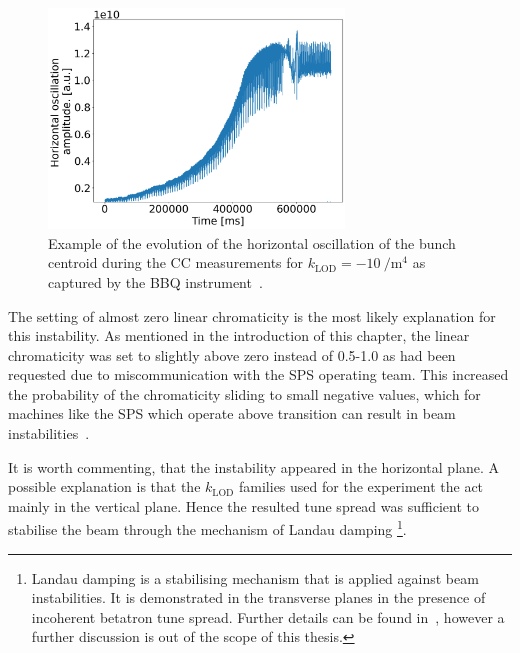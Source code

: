 \begin{figure}[!h]
   \centering         
   \includegraphics[width=0.7\textwidth]{images/Ch8/2022.05.16.17.49.04.430450.png}
       \caption{Example of the evolution of the horizontal oscillation of the bunch centroid during the CC measurements for $k_\mathrm{LOD}=-10 \ \mathrm{/m^4}$ as captured by the BBQ instrument~\cite{Boccardi:1055568}.}
       \label{fig:instability_BBQ_klod-15_4may2022}
\end{figure}


The setting of almost zero linear chromaticity is the most likely explanation for this instability. As mentioned in the introduction of this chapter, the linear chromaticity was set to slightly above zero instead of 0.5-1.0 as had been requested due to miscommunication with the SPS operating team. This increased the probability of the chromaticity sliding to small negative values, which for machines like the SPS which operate above transition can result in beam instabilities~\cite{collective_effects_cas_li}.


It is worth commenting, that the instability appeared in the horizontal plane. A possible explanation is that the $k_\mathrm{LOD}$ families used for the experiment the act mainly in the vertical plane. Hence the resulted tune spread was sufficient to stabilise the beam through the mechanism of Landau damping \footnote{Landau damping is a stabilising mechanism that is applied against beam instabilities. It is demonstrated in the transverse planes in the presence of incoherent betatron tune spread. Further details can be found in~\cite{Herr:1982428, Schenk:2665819}, however a further discussion is out of the scope of this thesis.}.


